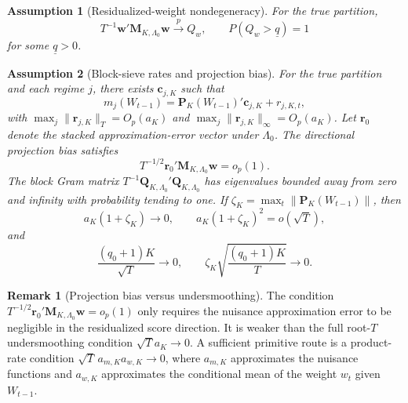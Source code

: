 \documentclass[12pt]{article}
\numberwithin{equation}{section}
\newtheorem{assumption}{Assumption}
\theoremstyle{definition}
\newtheorem{remark}{Remark}
\begin{document}
\begin{assumption}[Residualized-weight nondegeneracy]
\label{ass:weight-nondegenerate}
For the true partition,
\[
    T^{-1}\bm w'\bm M_{K,\Lambda_0}\bm w
    \xrightarrow{p} Q_w,
    \qquad
    P(Q_w>\underline q)=1
\]
for some \(\underline q>0\).
\end{assumption}

\begin{assumption}[Block-sieve rates and projection bias]
\label{ass:block-sieve}
For the true partition and each regime \(j\), there exists \(\bm c_{j,K}\) such that
\[
    m_j(W_{t-1})
    =
    \bm P_K(W_{t-1})'\bm c_{j,K}
    +
    r_{j,K,t},
\]
with \(\max_j\|\bm r_{j,K}\|_T=O_p(a_K)\) and \(\max_j\|\bm r_{j,K}\|_\infty=O_p(a_K)\). Let \(\bm r_0\) denote the stacked approximation-error vector under \(\Lambda_0\). The directional projection bias satisfies
\[
    T^{-1/2}\bm r_0'\bm M_{K,\Lambda_0}\bm w=o_p(1).
\]
The block Gram matrix \(T^{-1}\bm Q_{K,\Lambda_0}'\bm Q_{K,\Lambda_0}\) has eigenvalues bounded away from zero and infinity with probability tending to one. If \(\zeta_K=\max_t\|\bm P_K(W_{t-1})\|\), then
\[
    a_K(1+\zeta_K)\to0,
    \qquad
    a_K(1+\zeta_K)^2=o(\sqrt T),
\]
and
\[
    \frac{(q_0+1)K}{\sqrt T}\to0,
    \qquad
    \zeta_K\sqrt{\frac{(q_0+1)K}{T}}\to0.
\]
\end{assumption}

\begin{remark}[Projection bias versus undersmoothing]
The condition \(T^{-1/2}\bm r_0'\bm M_{K,\Lambda_0}\bm w=o_p(1)\) only requires the nuisance approximation error to be negligible in the residualized score direction. It is weaker than the full root-\(T\) undersmoothing condition \(\sqrt T a_K\to0\). A sufficient primitive route is a product-rate condition \(\sqrt T\,a_{m,K}a_{w,K}\to0\), where \(a_{m,K}\) approximates the nuisance functions and \(a_{w,K}\) approximates the conditional mean of the weight \(w_t\) given \(W_{t-1}\).
\end{remark}
\end{document}
